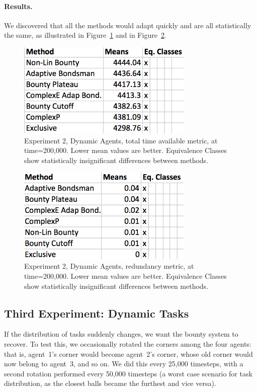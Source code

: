 \documentclass[letterpaper]{aamas2015}
\newcommand\paragrapha[1]{\paragraph*{{#1}.}}
\begin{document}
\paragrapha{Results}

We discovered that all the methods would adapt quickly and are all statistically the same, as illustrated in Figure~\ref{dynAgentT} and in Figure~\ref{dynAgentR}.


\begin{figure}[t]
\begin{center}\includegraphics[width=3.3in]{dynAgentT.png}\end{center}
\vspace{-0.5em}\caption{Experiment 2, Dynamic Agents, total time available metric, at time=200,000.  Lower mean values are better.  Equivalence Classes show statistically insignificant differences between methods.}
\label{dynAgentT}
\end{figure}

\begin{figure}[t]
\begin{center}\includegraphics[width=3.3in]{dynAgentR.png}\end{center}
\vspace{-0.5em}\caption{Experiment 2, Dynamic Agents, redundancy metric, at time=200,000.  Lower mean values are better.  Equivalence Classes show statistically insignificant differences between methods.}
\label{dynAgentR}
\end{figure}



\subsection{Third Experiment: Dynamic Tasks}
If the distribution of tasks suddenly changes, we want the bounty system to recover.  To test this, we occasionally rotated the corners among the four agents: that is, agent~1's corner would become agent~2's corner, whose old corner would now belong to agent~3, and so on.  We did this every 25,000 timesteps, with a second rotation performed every 50,000 timesteps (a worst case scenario for task distribution, as the closest balls became the furthest and vice versa).
\end{document}
